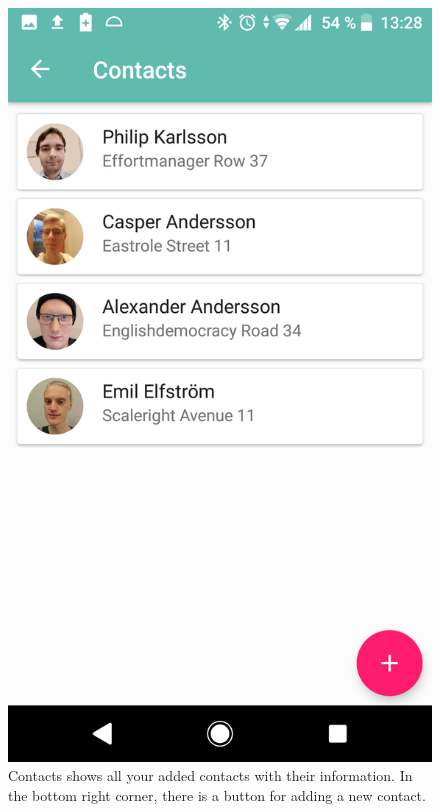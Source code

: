 \documentclass[acmlarge, review=false, screen=true]{acmart}
\begin{document}
      \begin{figure}[!tbp]
        \centering
        \begin{minipage}[b]{0.4\textwidth}
          \includegraphics[width=\textwidth]{images/Contacts.png}
          \caption{Contacts shows all your added contacts with their information. In the bottom right corner, there is a button for adding a new contact.\newline \newline}
          \label{fig:contacts}

\end{minipage}
\end{figure}
\end{document}
